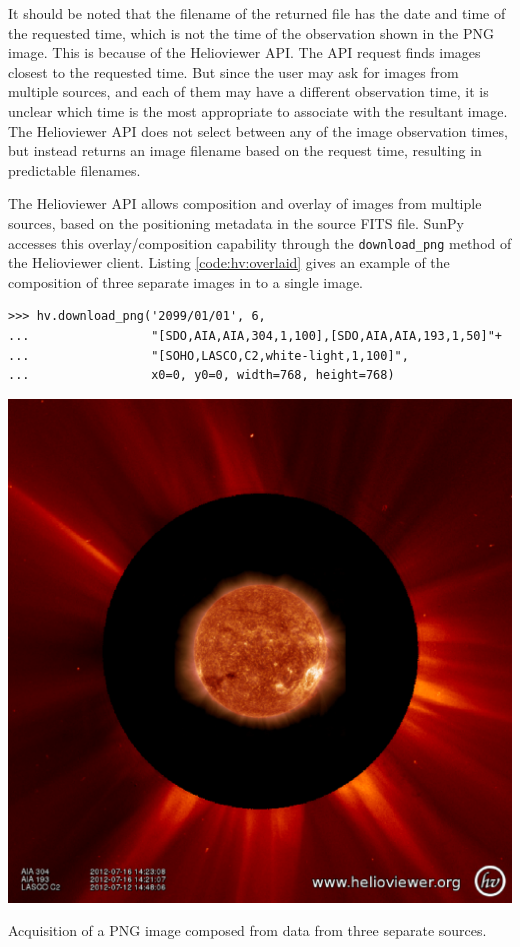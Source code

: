 It should be noted that the filename of the returned file has the date
and time of the requested time, which is not the time of the
observation shown in the PNG image.  This is because of the
Helioviewer API.  The API request finds images closest to the
requested time. But since the user may ask for images from multiple
sources, and each of them may have a different observation time, it is
unclear which time is the most appropriate to associate with the
resultant image.  The Helioviewer API does not select between any of
the image observation times, but instead returns an image filename
based on the request time, resulting in predictable filenames.

The Helioviewer API allows composition and overlay of images from
multiple sources, based on the positioning metadata in the source FITS
file.  SunPy accesses this overlay/composition capability through the
\texttt{download\_png} method of the Helioviewer client.  Listing
\ref{code:hv:overlaid} gives an example of the composition of three
separate images in to a single image.

\begin{listing}[H]
\begin{verbatim}
>>> hv.download_png('2099/01/01', 6,
...                 "[SDO,AIA,AIA,304,1,100],[SDO,AIA,AIA,193,1,50]"+
...                 "[SOHO,LASCO,C2,white-light,1,100]",
...                 x0=0, y0=0, width=768, height=768)
\end{verbatim}
\begin{center}
\includegraphics[width=0.8\columnwidth]{helioviewer_overlay_example}
\end{center}
\caption{Acquisition of a PNG image composed from data from three
  separate sources.}
\label{code:hv:overlaid}
\end{listing}

